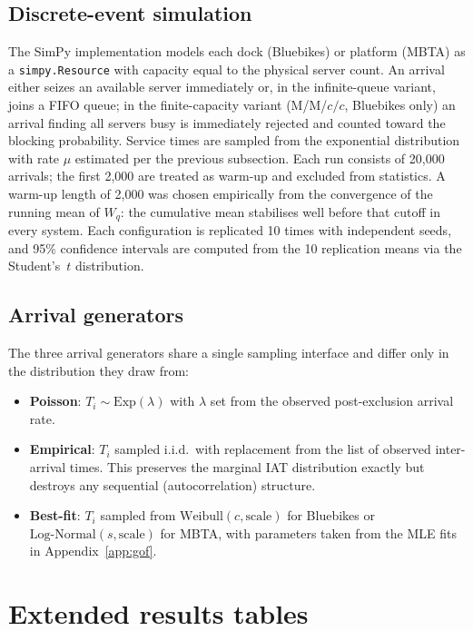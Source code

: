 \subsection{Discrete-event simulation}\label{app:des}

The SimPy implementation models each dock (Bluebikes) or platform (MBTA) as a \texttt{simpy.Resource} with capacity equal to the physical server count. An arrival either seizes an available server immediately or, in the infinite-queue variant, joins a FIFO queue; in the finite-capacity variant (M/M/$c/c$, Bluebikes only) an arrival finding all servers busy is immediately rejected and counted toward the blocking probability. Service times are sampled from the exponential distribution with rate $\mu$ estimated per the previous subsection. Each run consists of 20,000 arrivals; the first 2,000 are treated as warm-up and excluded from statistics. A warm-up length of 2,000 was chosen empirically from the convergence of the running mean of $W_q$: the cumulative mean stabilises well before that cutoff in every system. Each configuration is replicated 10 times with independent seeds, and 95\% confidence intervals are computed from the 10 replication means via the Student's~$t$ distribution.

\subsection{Arrival generators}\label{app:arrival-generators}

The three arrival generators share a single sampling interface and differ only in the distribution they draw from:
\begin{itemize}\itemsep 0pt
\item \textbf{Poisson}: $T_i \sim \mathrm{Exp}(\lambda)$ with $\lambda$ set from the observed post-exclusion arrival rate.
\item \textbf{Empirical}: $T_i$ sampled i.i.d.\ with replacement from the list of observed inter-arrival times. This preserves the marginal IAT distribution exactly but destroys any sequential (autocorrelation) structure.
\item \textbf{Best-fit}: $T_i$ sampled from $\text{Weibull}(c, \text{scale})$ for Bluebikes or $\text{Log-Normal}(s, \text{scale})$ for MBTA, with parameters taken from the MLE fits in Appendix~\ref{app:gof}.
\end{itemize}

\section{Extended results tables}\label{app:tables}

